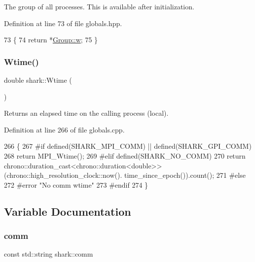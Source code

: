 The group of all processes. This is available after initialization. 

Definition at line 73 of file globals.\+hpp.


\begin{DoxyCode}
73                                 \{
74         \textcolor{keywordflow}{return} *\hyperlink{classshark_1_1_group_af542c8e71a81c12d6a73203ef9152d1f}{Group::w};
75     \}
\end{DoxyCode}
\hypertarget{namespaceshark_a4ca07420a22b68c516e9488d2748a578}{}\label{namespaceshark_a4ca07420a22b68c516e9488d2748a578} 
\subsubsection{\texorpdfstring{Wtime()}{Wtime()}}
{\footnotesize\ttfamily double shark\+::\+Wtime (\begin{DoxyParamCaption}{ }\end{DoxyParamCaption})}

Returns an elapsed time on the calling process (local). 

Definition at line 266 of file globals.\+cpp.


\begin{DoxyCode}
266                     \{
267 \textcolor{preprocessor}{#if defined(SHARK\_MPI\_COMM) || defined(SHARK\_GPI\_COMM)}
268     \textcolor{keywordflow}{return} MPI\_Wtime();
269 \textcolor{preprocessor}{#elif defined(SHARK\_NO\_COMM)}
270     \textcolor{keywordflow}{return} chrono::duration\_cast<chrono::duration<double>>(chrono::high\_resolution\_clock::now().
      time\_since\_epoch()).count();
271 \textcolor{preprocessor}{#else}
272 \textcolor{preprocessor}{#error "No comm wtime"}
273 \textcolor{preprocessor}{#endif}
274 \}
\end{DoxyCode}


\subsection{Variable Documentation}
\hypertarget{namespaceshark_addbd5781efcffd1b0502c83220027b90}{}\label{namespaceshark_addbd5781efcffd1b0502c83220027b90} 
\subsubsection{\texorpdfstring{comm}{comm}}
{\footnotesize\ttfamily const std\+::string shark\+::comm}


